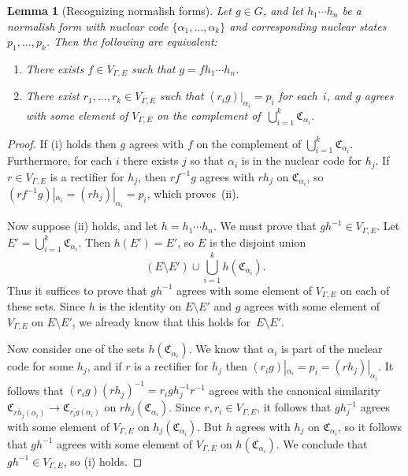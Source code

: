 \documentclass[11pt,letterpaper]{amsart}
\newtheorem{lemma}[theorem]{Lemma}
\theoremstyle{definition}
\newcommand{\C}{\mathfrak{C}}
\begin{document}
\begin{lemma}[Recognizing normalish forms]\label{lem:RecognizingNormalish}
Let $g\in G$, and let $h_1\cdots h_n$ be a normalish form with nuclear code $\{\alpha_1,\ldots,\alpha_k\}$ and corresponding nuclear states $p_1,\ldots,p_k$.  Then the following are equivalent:
\begin{enumerate}
    \item There exists $f\in V_{\Gamma,E}$ such that $g=fh_1\cdots h_n$.\smallskip
    \item There exist $r_1,\ldots,r_k\in V_{\Gamma,E}$ such that $(r_ig)|_{\alpha_i}=p_i$ for each~$i$, and $g$ agrees with some element of $V_{\Gamma,E}$ on the complement of\/~$\bigcup_{i=1}^k\C_{\alpha_i}$.
\end{enumerate}
\end{lemma}
\begin{proof}
If (i) holds then $g$ agrees with $f$ on the complement of $\bigcup_{i=1}^k \C_{\alpha_i}$.  Furthermore, for each $i$ there exists $j$ so that $\alpha_i$ is in the nuclear code for $h_j$. If $r\in V_{\Gamma,E}$ is a rectifier for $h_j$, then $rf^{-1}g$ agrees with $rh_j$ on $\C_{\alpha_i}$, so $(rf^{-1}g)|_{\alpha_i}=(rh_j)|_{\alpha_i}=p_i$, which proves~(ii).

Now suppose (ii) holds, and let $h=h_1\cdots h_n$.  We must prove that $gh^{-1}\in V_{\Gamma,E}$.  Let $E'=\bigcup_{i=1}^k \C_{\alpha_i}$.  Then $h(E')=E'$, so $E$ is the disjoint union
\[
(E\setminus E')\cup \bigcup_{i=1}^k
h(\C_{\alpha_i}).
\]
Thus it suffices to prove that $gh^{-1}$ agrees with some element of $V_{\Gamma,E}$ on each of these sets.  Since $h$ is the identity on $E\setminus E'$ and $g$ agrees with some element of $V_{\Gamma,E}$ on $E\setminus E'$, we already know that this holds for~$E\setminus E'$.

Now consider one of the sets $h(\C_{\alpha_i})$. We know that $\alpha_i$ is part of the nuclear code for some $h_j$, and if $r$ is a rectifier for $h_j$ then $(r_ig)|_{\alpha_i}=p_i=(rh_j)|_{\alpha_i}$.  It follows that $(r_ig)(rh_j)^{-1}=r_igh_j^{-1}r^{-1}$ agrees with the canonical similarity $\C_{\overline{rh_j}(\alpha_i)}\to \C_{\overline{r_ig}(\alpha_i)}$ on $rh_j(\C_{\alpha_i})$. Since $r,r_i\in V_{\Gamma,E}$, it follows that $gh_j^{-1}$ agrees with some element of $V_{\Gamma,E}$ on $h_j(\C_{\alpha_i})$.  But $h$ agrees with $h_j$ on $\C_{\alpha_i}$, so it follows that $gh^{-1}$ agrees with some element of $V_{\Gamma,E}$ on $h(\C_{\alpha_i})$.  We conclude that $gh^{-1}\in V_{\Gamma,E}$, so (i) holds.
\end{proof}
\end{document}
